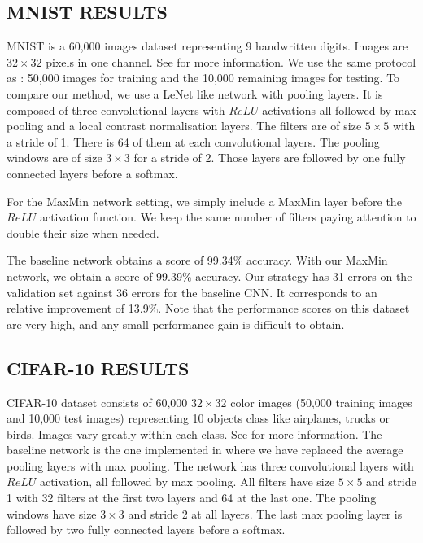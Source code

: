 \documentclass{article}
\begin{document}
\subsection{MNIST RESULTS}
MNIST is a 60,000 images dataset representing 9 handwritten digits. Images are $32 \times 32$ pixels in one channel. See \cite{multicolumn} for more information. We use the same protocol as \cite{multicolumn}: 50,000 images for training and the 10,000 remaining images for testing. To compare our method,  we use a LeNet like network with pooling layers. It is composed of three convolutional layers with $ReLU$ activations all followed by max pooling and a local contrast normalisation layers. The filters are of size $5 \times 5$ with a stride of 1. There is 64 of them at each convolutional layers. The pooling windows are of size $3\times 3$ for a stride of 2. Those layers are followed by one fully connected layers before a softmax. 

For the MaxMin network setting, we simply include a MaxMin layer before the $ReLU$ activation function. We keep the same number of filters paying attention to double their size when needed. 

The baseline network obtains a score of 99.34\% accuracy. With our MaxMin network, we obtain a score of 99.39\% accuracy.
Our strategy has 31 errors on the validation set against 36 errors for the baseline CNN. It corresponds to an relative improvement of 13.9\%.    Note that the performance scores on this dataset are very high, and any small performance gain is difficult to obtain.                
                                                                                  
\subsection{CIFAR-10 RESULTS}
CIFAR-10 dataset consists of 60,000 $32 \times 32$ color images (50,000 training images and 10,000 test images) representing 10 objects class like airplanes, trucks or birds. Images vary greatly within each class. See \cite{multicolumn} for more information. The baseline network is the one implemented in \cite{matconvnet} where we have replaced the average pooling layers with max pooling. The network has three convolutional layers with $ReLU$ activation, all followed by max pooling. All filters have size $5 \times 5$ and stride 1 with 32 filters at the first two layers and 64 at the last one. The pooling windows have size $3\times 3$ and stride 2 at all layers. The last max pooling layer is followed by two fully connected layers before a softmax. 
\end{document}
